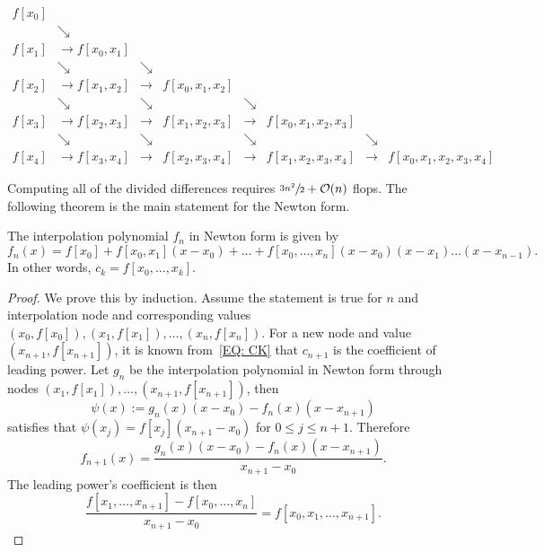 \begin{tcolorbox}
    \begin{equation}\label{EQ: ALG NEWTON}
    \begin{aligned}
        f[x_0] &               &\\ 
               &\searrow       &\\ 
        f[x_1] &\to f[x_0, x_1]& \\
               &\searrow        &\searrow&\\ 
        f[x_2] & \to f[x_1, x_2]&\to& f[x_0, x_1, x_2]\\
               &\searrow        &\searrow& &\searrow&\\ 
        f[x_3] &\to f[x_2, x_3] &\to& f[x_1, x_2, x_3] &\to & f[x_0, x_1, x_2, x_3]\\
               &\searrow        &\searrow & &\searrow&  &\searrow &\\ 
        f[x_4] & \to f[x_3, x_4]&\to& f[x_2, x_3, x_4] &\to & f[x_1, x_2, x_3, x_4] &\to&  f[x_0, x_1, x_2, x_3, x_4] 
    \end{aligned}
\end{equation}
\end{tcolorbox}
Computing all of the divided differences requires $\sfrac{3n^2}{2} +\mathcal O(n)$ flops. The following theorem is the main statement for the Newton form.
\begin{theorem}
\label{Thm: 2-New-for}
    The interpolation polynomial $f_n$ in Newton form is given by 
    \begin{equation}
        f_n(x) = f[x_0] + f[x_0, x_1](x-x_0) + \dots + f[x_0, \dots, x_n](x - x_0)(x - x_1)\dots (x - x_{n-1}).
    \end{equation}
    In other words, $c_k = f[x_0, \dots, x_k]$.
\end{theorem}
\begin{proof}
    We prove this by induction. Assume the statement is true for $n$ and interpolation node and corresponding values $(x_0, f[x_0]), (x_1, f[x_1]), \dots, (x_n, f[x_n])$. For a new node and value $(x_{n+1}, f[x_{n+1}])$, it is known from~\eqref{EQ: CK} that $c_{n+1}$ is the coefficient of leading power. Let $g_n$ be the interpolation polynomial in Newton form through nodes $(x_1, f[x_1]), \dots, (x_{n+1}, f[x_{n+1}])$, then 
    $$\psi(x)  := g_n(x)(x - x_0) - f_n(x)(x - x_{n+1})$$
    satisfies that $\psi(x_j) = f[x_j](x_{n+1} - x_0)$ for $0\le j\le {n+1}$. Therefore 
    \begin{equation}
        f_{n+1}(x) = \frac{g_n(x)(x - x_0) - f_n(x)(x - x_{n+1})}{x_{n+1} - x_0}.
    \end{equation}
    The leading power's coefficient is then 
    \begin{equation}
        \frac{f[x_1, \dots, x_{n+1}] - f[x_0, \dots, x_n]}{x_{n+1} - x_0} = f[x_0, x_1,\dots, x_{n+1}].
    \end{equation}
\end{proof}

